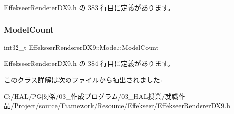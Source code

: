  Effekseer\+Renderer\+D\+X9.\+h の 383 行目に定義があります。

\mbox{\label{class_effekseer_renderer_d_x9_1_1_model_a993f041558265db631654723ca973e0a}} 
\subsubsection{\texorpdfstring{Model\+Count}{ModelCount}}
{\footnotesize\ttfamily int32\+\_\+t Effekseer\+Renderer\+D\+X9\+::\+Model\+::\+Model\+Count}



 Effekseer\+Renderer\+D\+X9.\+h の 384 行目に定義があります。



このクラス詳解は次のファイルから抽出されました\+:\begin{DoxyCompactItemize}
\item 
C\+:/\+H\+A\+L/\+P\+G関係/03\+\_\+作成プログラム/03\+\_\+\+H\+A\+L授業/就職作品/\+Project/source/\+Framework/\+Resource/\+Effekseer/\mbox{\hyperlink{_effekseer_renderer_d_x9_8h}{Effekseer\+Renderer\+D\+X9.\+h}}\end{DoxyCompactItemize}
